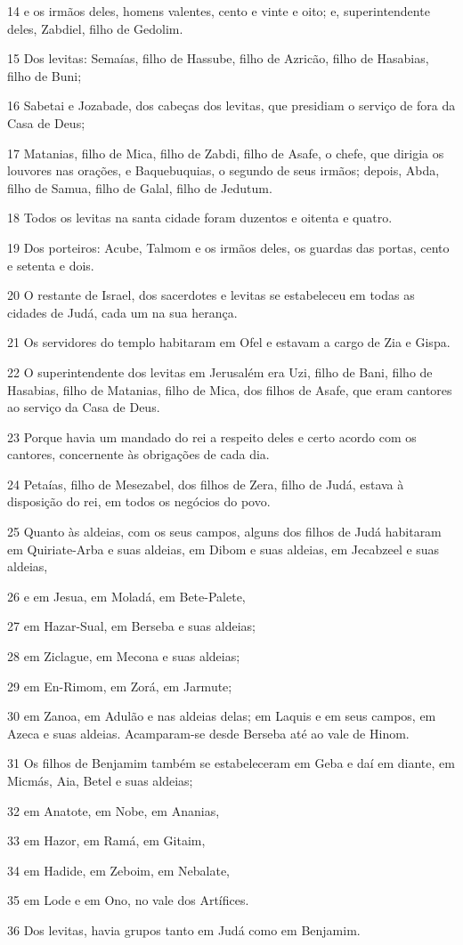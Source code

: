 \par 14 e os irmãos deles, homens valentes, cento e vinte e oito; e, superintendente deles, Zabdiel, filho de Gedolim.
\par 15 Dos levitas: Semaías, filho de Hassube, filho de Azricão, filho de Hasabias, filho de Buni;
\par 16 Sabetai e Jozabade, dos cabeças dos levitas, que presidiam o serviço de fora da Casa de Deus;
\par 17 Matanias, filho de Mica, filho de Zabdi, filho de Asafe, o chefe, que dirigia os louvores nas orações, e Baquebuquias, o segundo de seus irmãos; depois, Abda, filho de Samua, filho de Galal, filho de Jedutum.
\par 18 Todos os levitas na santa cidade foram duzentos e oitenta e quatro.
\par 19 Dos porteiros: Acube, Talmom e os irmãos deles, os guardas das portas, cento e setenta e dois.
\par 20 O restante de Israel, dos sacerdotes e levitas se estabeleceu em todas as cidades de Judá, cada um na sua herança.
\par 21 Os servidores do templo habitaram em Ofel e estavam a cargo de Zia e Gispa.
\par 22 O superintendente dos levitas em Jerusalém era Uzi, filho de Bani, filho de Hasabias, filho de Matanias, filho de Mica, dos filhos de Asafe, que eram cantores ao serviço da Casa de Deus.
\par 23 Porque havia um mandado do rei a respeito deles e certo acordo com os cantores, concernente às obrigações de cada dia.
\par 24 Petaías, filho de Mesezabel, dos filhos de Zera, filho de Judá, estava à disposição do rei, em todos os negócios do povo.
\par 25 Quanto às aldeias, com os seus campos, alguns dos filhos de Judá habitaram em Quiriate-Arba e suas aldeias, em Dibom e suas aldeias, em Jecabzeel e suas aldeias,
\par 26 e em Jesua, em Moladá, em Bete-Palete,
\par 27 em Hazar-Sual, em Berseba e suas aldeias;
\par 28 em Ziclague, em Mecona e suas aldeias;
\par 29 em En-Rimom, em Zorá, em Jarmute;
\par 30 em Zanoa, em Adulão e nas aldeias delas; em Laquis e em seus campos, em Azeca e suas aldeias. Acamparam-se desde Berseba até ao vale de Hinom.
\par 31 Os filhos de Benjamim também se estabeleceram em Geba e daí em diante, em Micmás, Aia, Betel e suas aldeias;
\par 32 em Anatote, em Nobe, em Ananias,
\par 33 em Hazor, em Ramá, em Gitaim,
\par 34 em Hadide, em Zeboim, em Nebalate,
\par 35 em Lode e em Ono, no vale dos Artífices.
\par 36 Dos levitas, havia grupos tanto em Judá como em Benjamim.

